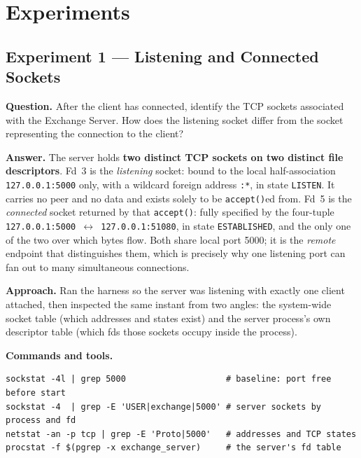 \documentclass[11pt,a4paper]{article}
\newcommand{\cmd}[1]{\texttt{\small #1}}
\begin{document}
\newpage
\section{Experiments}

\subsection{Experiment 1 --- Listening and Connected Sockets}

\textbf{Question.} After the client has connected, identify the TCP sockets
associated with the Exchange Server. How does the listening socket differ from
the socket representing the connection to the client?

\textbf{Answer.} The server holds \textbf{two distinct TCP sockets on two
distinct file descriptors}. Fd~3 is the \emph{listening} socket: bound to the
local half-association \cmd{127.0.0.1:5000} only, with a wildcard foreign
address \cmd{*:*}, in state \cmd{LISTEN}. It carries no peer and no data and
exists solely to be \cmd{accept()}ed from. Fd~5 is the \emph{connected} socket
returned by that \cmd{accept()}: fully specified by the four-tuple
\cmd{127.0.0.1:5000 $\leftrightarrow$ 127.0.0.1:51080}, in state
\cmd{ESTABLISHED}, and the only one of the two over which bytes flow. Both share
local port 5000; it is the \emph{remote} endpoint that distinguishes them, which
is precisely why one listening port can fan out to many simultaneous
connections.

\textbf{Approach.} Ran the harness so the server was listening with exactly one
client attached, then inspected the same instant from two angles: the
system-wide socket table (which addresses and states exist) and the server
process's own descriptor table (which fds those sockets occupy inside the
process).

\textbf{Commands and tools.}
\begin{Verbatim}[fontsize=\small,frame=single]
sockstat -4l | grep 5000                    # baseline: port free before start
sockstat -4  | grep -E 'USER|exchange|5000' # server sockets by process and fd
netstat -an -p tcp | grep -E 'Proto|5000'   # addresses and TCP states
procstat -f $(pgrep -x exchange_server)     # the server's fd table
\end{Verbatim}
\end{document}
